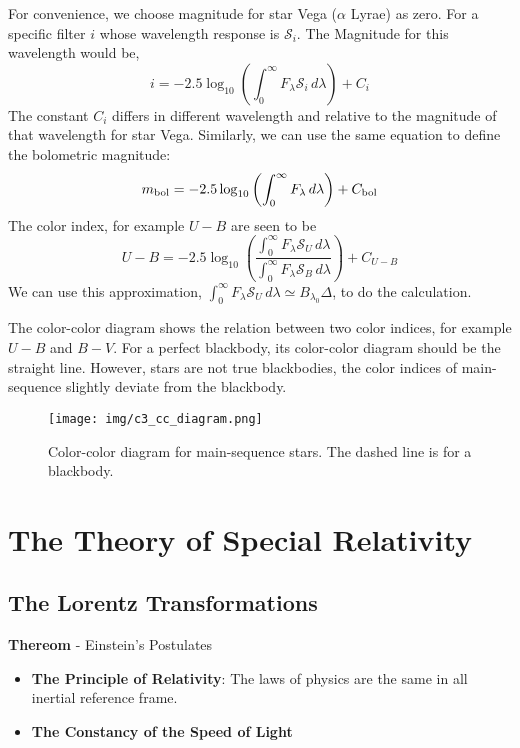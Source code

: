 \documentclass{article}
\numberwithin{equation}{section}
\numberwithin{figure}{section}
\begin{document}
	For convenience, we choose magnitude for star Vega ($\alpha$ Lyrae) as zero. For a specific filter $i$ whose wavelength response is $\mathcal{S}_i$. The Magnitude for this wavelength would be,
	\begin{equation}
		i = -2.5\log_{10}\left( \int_0^\infty F_\lambda\mathcal{S}_i\,d\lambda\right) + C_i
	\end{equation}
	The constant $C_i$ differs in different wavelength and relative to the magnitude of that wavelength for star Vega. Similarly, we can use the same equation to define the bolometric magnitude:
	\begin{equation}
		m_{\rm bol} = -2.5\log_{10}\left( \int_0^\infty F_\lambda\,d\lambda\right) + C_{\rm bol}
	\end{equation}
	The color index, for example $U-B$ are seen to be
	\begin{equation}
		U-B = -2.5\log_{10}\left(\frac{\int_0^\infty F_\lambda\mathcal{S}_U\,d\lambda}{\int_0^\infty F_\lambda\mathcal{S}_B\,d\lambda}\right) + C_{U-B}
	\end{equation}
	We can use this approximation, $\int_0^\infty F_\lambda\mathcal{S}_U\,d\lambda \simeq B_{\lambda_0}\Delta$, to do the calculation.
	
	The color-color diagram shows the relation between two color indices, for example $U-B$ and $B-V$. For a perfect blackbody, its color-color diagram should be the straight line. However, stars are not true blackbodies, the color indices of main-sequence slightly deviate from the blackbody.
	\begin{figure}[h!]
		\begin{center}
			\texttt{[image: img/c3\_cc\_diagram.png]}
			\caption{Color-color diagram for main-sequence stars. The dashed line is for a blackbody.}
		\end{center}
	\end{figure}
	
\section{The Theory of Special Relativity}
	\subsection{The Lorentz Transformations}
	{\bf Thereom} - Einstein's Postulates
	\begin{itemize}
		\item {\bf The Principle of Relativity}: The laws of physics are the same in all inertial reference frame.
		\item {\bf The Constancy of the Speed of Light}
	\end{itemize}
\end{document}
